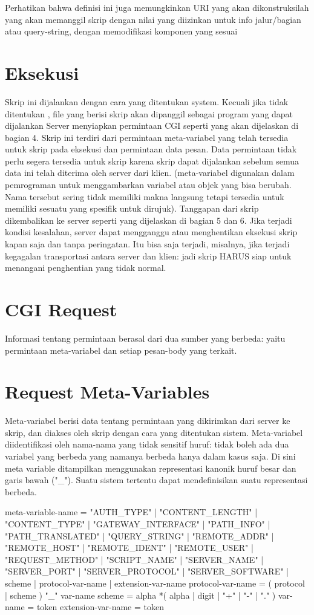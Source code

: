 \documentclass{article}
\begin{document}
Perhatikan bahwa definisi ini juga memungkinkan URI yang akan dikonstruksilah yang akan memanggil skrip dengan nilai yang diizinkan untuk info jalur/bagian atau query-string, dengan memodifikasi komponen yang sesuai
\section{Eksekusi}
Skrip ini dijalankan dengan cara yang ditentukan system.
Kecuali jika tidak ditentukan , file yang berisi skrip akan dipanggil sebagai program yang dapat dijalankan
Server menyiapkan permintaan CGI seperti yang akan dijelaskan di bagian 4. Skrip ini terdiri dari permintaan meta-variabel yang telah tersedia untuk skrip pada eksekusi dan permintaan data pesan. Data permintaan tidak perlu segera tersedia untuk skrip karena skrip dapat dijalankan sebelum semua data ini telah diterima oleh server dari klien.
(meta-variabel digunakan dalam pemrograman untuk menggambarkan variabel atau objek yang bisa berubah. Nama tersebut sering tidak memiliki makna langsung tetapi tersedia untuk memiliki sesuatu yang spesifik untuk dirujuk).
Tanggapan dari skrip dikembalikan ke server seperti yang dijelaskan di bagian 5 dan 6. Jika terjadi kondisi kesalahan, server dapat mengganggu atau menghentikan eksekusi skrip kapan saja dan tanpa peringatan. Itu bisa saja terjadi, misalnya, jika terjadi kegagalan transportasi antara server dan klien: jadi skrip HARUS siap untuk menangani penghentian yang tidak normal.
\section{CGI Request}
Informasi tentang permintaan berasal dari dua sumber yang berbeda: yaitu permintaan meta-variabel dan setiap pesan-body yang terkait.
\section{Request Meta-Variables}
Meta-variabel berisi data tentang permintaan yang dikirimkan dari server ke skrip, dan diakses oleh skrip dengan cara yang ditentukan sistem. Meta-variabel diidentifikasi oleh nama-nama yang tidak sensitif huruf: tidak boleh ada dua variabel yang berbeda yang namanya berbeda hanya dalam kasus saja.
Di sini meta variable ditampilkan menggunakan representasi kanonik  huruf besar dan garis bawah ("_"). Suatu sistem tertentu dapat mendefinisikan suatu  representasi berbeda.

meta-variable-name = "AUTH_TYPE" | "CONTENT_LENGTH" |
                           "CONTENT_TYPE" | "GATEWAY_INTERFACE" |
                           "PATH_INFO" | "PATH_TRANSLATED" |
                           "QUERY_STRING" | "REMOTE_ADDR" |
                           "REMOTE_HOST" | "REMOTE_IDENT" |
                           "REMOTE_USER" | "REQUEST_METHOD" |
                           "SCRIPT_NAME" | "SERVER_NAME" |
                           "SERVER_PORT" | "SERVER_PROTOCOL" |
                           "SERVER_SOFTWARE" | scheme |
                           protocol-var-name | extension-var-name
protocol-var-name = ( protocol | scheme ) "_" var-name
scheme = alpha *( alpha | digit | "+" | "-" | "." )
var-name = token
extension-var-name = token
\end{document}
